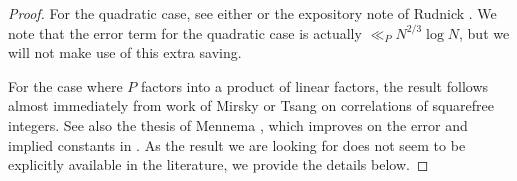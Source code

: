 \documentclass[11pts]{amsart}
\numberwithin{equation}{section}
\begin{document}
\begin{proof}
    For the quadratic case, see either \cite{Ricci_Quadratic_SF} or the expository note of Rudnick \cite{Rudnick_Quadratic_SF}. We note that the error term for the quadratic case is actually $\ll_P N^{2/3}\log N$, but we will not make use of this extra saving.
    
    For the case where $P$ factors into a product of linear factors, the result follows almost immediately from work of Mirsky \cite{10.1093/qmath/os-18.1.178} or Tsang \cite[Theorem 3]{Tsang_HL} on correlations of squarefree integers. See also the thesis of Mennema \cite{Mennema_HL}, which improves on the error and implied constants in \cite{Tsang_HL}. As the result we are looking for does not seem to be explicitly available in the literature, we provide the details below.
    

\end{proof}
\end{document}
